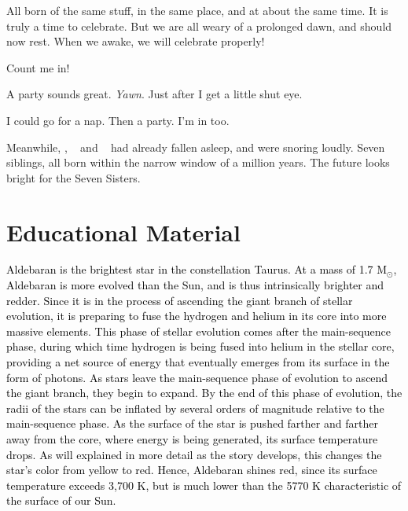 \documentclass[main.tex]{subfiles}
\begin{document}
\par \Maia All born of the same stuff, in the same place, and at about the same time.  It is truly a time to celebrate.  But we are all weary of a prolonged dawn, and should now rest.  When we awake, we will celebrate properly!

\par \Merope  Count me in!  

\par \Electra A party sounds great. \textit{Yawn}. Just after I get a little shut eye.

\par \Sterope I could go for a nap. Then a party.  I'm in too.

\par \nar Meanwhile, \rmtaygete, \rmalcyone~ and \rmcelaeno~ had already fallen asleep, and were snoring loudly.  Seven siblings, all born within the narrow window of a million years.  The future looks bright for the Seven Sisters.

\section{Educational Material}

\begin{tcolorbox}[sharp corners, colback=red!30, colframe=red!80!blue, title=Box \refstepcounter{educhap1}\label{boxchap1:ald}\ref{boxchap1:ald} -- Aldebaran]
\par \textcolor{black} {Aldebaran is the brightest star in the constellation Taurus.  At a mass of 1.7 M$_{\odot}$, Aldebaran is more evolved than the Sun, and is thus intrinsically brighter and redder.  Since it is in the process of ascending the giant branch of stellar evolution, it is preparing to fuse the hydrogen and helium in its core into more massive elements.  This phase of stellar evolution comes after the main-sequence phase, during which time hydrogen is being fused into helium in the stellar core, providing a net source of energy that eventually emerges from its surface in the form of photons.   As stars leave the main-sequence phase of evolution to ascend the giant branch, they begin to expand.  By the end of this phase of evolution, the radii of the stars can be inflated by several orders of magnitude relative to the main-sequence phase.  As the surface of the star is pushed farther and farther away from the core, where energy is being generated, its surface temperature drops.  As will explained in more detail as the story develops, this changes the star's color from yellow to red.  Hence, Aldebaran shines red, since its surface temperature exceeds 3,700 K, but is much lower than the 5770 K characteristic of the surface of our Sun.}
\end{tcolorbox}
\end{document}
